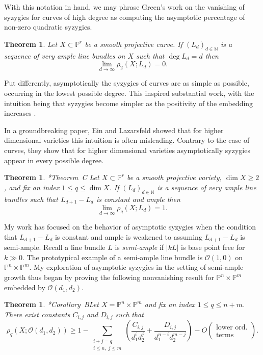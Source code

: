 \documentclass[11pt,reqno]{amsart}
\newtheorem{theorem}[lemma]{Theorem}
\theoremstyle{remark}
\renewcommand{\O}{\mathcal{O}}
\newcommand{\N}{\mathbb{N}}
\renewcommand{\P}{\mathbb{P}}
\begin{document}
With this notation in hand, we may phrase Green's work on the vanishing of syzygies for curves of high degree as computing the asymptotic percentage of non-zero quadratic syzygies. 

\begin{theorem}\cite{green84-I}
Let $X\subset \P^r$ be a smooth projective curve. If $(L_{d})_{d\in\N}$ is a sequence of very ample line bundles on $X$ such that $\deg L_{d} = d$ then 
\[
\lim_{d\to \infty} \rho_{2}\left(X;L_{d}\right) = 0.
\]
\end{theorem}

Put differently, asymptotically the syzygies of curves are as simple as possible, occurring in the lowest possible degree. This inspired substantial work, with the intuition being that syzygies become simpler as the positivity of the embedding increases \cite{ottavianiPaoletti01, einLazarsfeld93, lazarsfeldPareschiPopa11, pareschi00, pareschiPopa03, pareschiPopa04}.  

In a groundbreaking paper, Ein and Lazarsfeld showed that for higher dimensional varieties this intuition is often misleading. Contrary to the case of curves, they show that for higher dimensional varieties  asymptotically syzygies appear in every possible degree. 
  
\begin{theorem}\cite{einLazarsfeld12}*{Theorem~C}
Let $X\subset \P^r$ be a smooth projective variety, $\dim X \geq2$, and fix an index $1\leq q \leq \dim X$. If $(L_{d})_{d\in\N}$ is a sequence of very ample line bundles such that $L_{d+1}-L_{d}$ is constant and ample then
\[
\lim_{d\to\infty} \rho_{q}\left(X; L_d\right) = 1.
\]
\end{theorem}

My work has focused on the behavior of asymptotic syzygies when the condition that $L_{d+1}-L_{d}$ is constant and ample is weakened to assuming $L_{d+1}-L_{d}$ is semi-ample. Recall a line bundle $L$ is \textit{semi-ample} if $|kL|$ is base point free for $k\gg0$. The prototypical example of a semi-ample line bundle is $\O(1,0)$ on $\P^{n}\times \P^{m}$. My exploration of asymptotic syzygies in the setting of semi-ample growth thus began by proving the following nonvanishing result for $\P^{n}\times\P^{m}$ embedded by $\O(d_{1},d_{2})$. 

\begin{theorem}\cite{bruce19-semiample}*{Corollary~B}\label{thm:bruce-semiample}
Let $X=\P^{n}\times\P^{m}$ and fix an index $1\leq q \leq n+m$. There exist constants $C_{i,j}$ and $D_{i,j}$ such that
\[
\rho_{q}\left(X; \O\left(d_1,d_2\right)\right)\geq1-\sum_{\substack{i+j=q \\  i \leq n, \; j \leq m}}\left(
\frac{C_{i,j}}{d_1^id_2^j}+\frac{D_{i,j}}{d_1^{n-i}d_2^{m-j}}\right)-O\left(\begin{matrix}\text{lower ord.}\\ \text{terms}\end{matrix}\right).
\]
\end{theorem}
\end{document}
